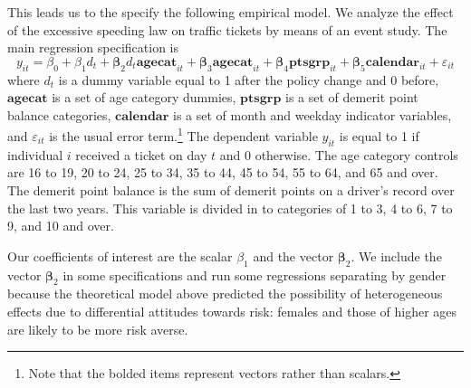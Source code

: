This leads us to the specify the following empirical model.
% 
We analyze the effect of the excessive speeding law on traffic tickets 
by means of an event study. 
The main regression specification is
%
$$
y_{it} = \beta_0 + \beta_1 d_t
      + \bm{\beta}_2 d_t \bm{agecat}_{it} + \bm{\beta}_3 \mathbf{agecat}_{it}
      + \bm{\beta}_4 \bm{ptsgrp}_{it}
      + \bm{\beta}_5 \bm{calendar}_{it}
      + \varepsilon_{it}
$$
%
where $d_t$ is a dummy variable equal to 1 after the policy change and 0 before, 
$\mathbf{agecat}$ is a set of age category dummies, 
$\mathbf{ptsgrp}$ is a set of demerit point balance categories, 
$\mathbf{calendar}$ is a set of month and weekday indicator variables, 
and $\varepsilon_{it}$ is the usual error term.\footnote{%
Note that the bolded items represent vectors rather than scalars.}
%  
The dependent variable $y_{it}$ is equal to 1 if individual $i$ received a ticket on day $t$ and 0 otherwise. 
The age category controls are 16 to 19, 20 to 24, 25 to 34, 35 to 44, 45 to 54, 55 to 64, and 65 and over. 
The demerit point balance is the sum of demerit points on a driver’s record over the last two years. 
This variable is divided in to categories of 1 to 3, 4 to 6, 7 to 9, and 10 and over.





Our coefficients of interest are the scalar $\beta_1$ and the vector $\bm{\beta}_2$. 
We include the vector $\bm{\beta}_2$ in some specifications 
and run some regressions separating by gender because the theoretical model 
above 
predicted the possibility of heterogeneous effects due to differential attitudes towards risk: 
females and those of higher ages are likely to be more risk averse. %





